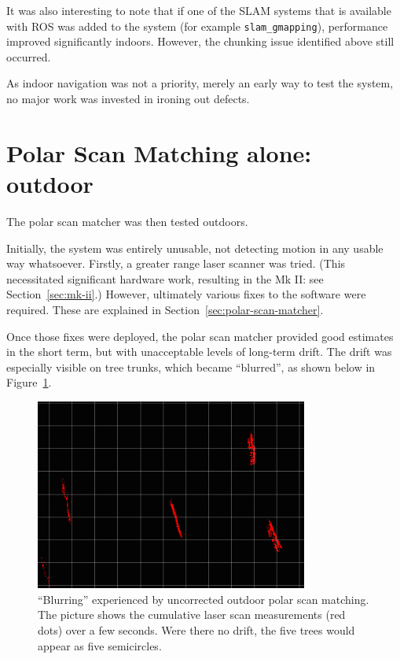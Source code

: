 \documentclass[12pt,oneside,a4paper]{book}
\begin{document}
It was also interesting to note that if one of the SLAM systems that
is available with ROS was added to the system (for example
\texttt{slam\_gmapping}), performance improved significantly
indoors. However, the chunking issue identified above still occurred.

As indoor navigation was not a priority, merely an early way to test
the system, no major work was invested in ironing out defects. 

\section{Polar Scan Matching alone: outdoor}
\label{sec:psm-outdoor}

The polar scan matcher was then tested outdoors.

Initially, the system was entirely unusable, not detecting motion in
any usable way whatsoever. Firstly, a greater range laser scanner was
tried. (This necessitated significant hardware work, resulting in the
Mk II: see Section~\ref{sec:mk-ii}.) However, ultimately various fixes
to the software were required. These are explained in
Section~\ref{sec:polar-scan-matcher}.

Once those fixes were deployed, the polar scan matcher provided good
estimates in the short term, but with unacceptable levels of long-term
drift. The drift was especially visible on tree trunks, which became
``blurred'', as shown below in Figure~\ref{fig:blur-detailed}.

\begin{figure}[h!]
  \centering
  \includegraphics[width=0.8\textwidth]{figs/blurring}
  \caption{``Blurring'' experienced by uncorrected outdoor polar scan
    matching. The picture shows the cumulative laser scan measurements
  (red dots) over a few seconds. Were there no drift, the five trees would
  appear as five semicircles.}
  \label{fig:blur-detailed}
\end{figure}
\end{document}

